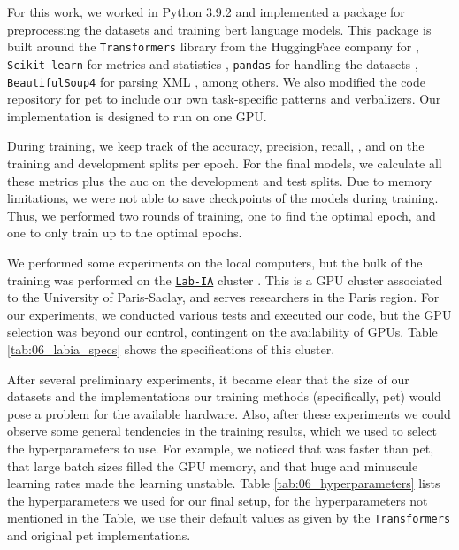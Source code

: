 \label{06_implementation_and_hardware}

For this work, we worked in Python 3.9.2 and implemented a package for preprocessing the datasets and training \gls{bert} language models. This package is built around the \texttt{Transformers} library from the  HuggingFace company  for \finetuning{} , \texttt{Scikit-learn} for metrics and statistics , \texttt{pandas} for handling the datasets , \texttt{BeautifulSoup4} for parsing XML , among others. We also modified the code repository for \gls{pet} to include our own task-specific patterns and verbalizers.  Our implementation is designed to run on one GPU.






During training, we keep track of the accuracy, precision, recall, \fOne{}, and \fTwo{} on the training and development splits per epoch. For the final models, we calculate all these metrics plus the \gls{auc} on the development and test splits. Due to memory limitations, we were not able to save  checkpoints of the models during training. Thus, we performed two rounds of training, one to find the optimal epoch, and one to only train up to the optimal epochs.



We performed some experiments on the \MAIAGE{} local computers, but the bulk of the training was performed on the \href{http://hebergement.universite-paris-saclay.fr/lab-ia/}{\texttt{Lab-IA}} cluster . This is a GPU cluster associated to the University of Paris-Saclay, and serves researchers in the Paris region. For our experiments, we conducted various tests and executed our code, but the GPU selection was beyond our control, contingent on the availability of GPUs. Table \ref{tab:06_labia_specs} shows the specifications of this cluster.







After several preliminary experiments, it became clear that the size of our datasets and the implementations our training methods (specifically, \gls{pet}) would pose a problem for the available hardware. 
Also, after these experiments we could observe some general tendencies in the training results, which we used to select the hyperparameters to use. For example, we noticed that \finetuning{} was faster than \gls{pet}, that large batch sizes filled the GPU memory, and that huge and minuscule learning rates made the learning unstable. Table \ref{tab:06_hyperparameters} lists the hyperparameters we used for our final setup, for the hyperparameters not mentioned in the Table, we use their default values as given by the \texttt{Transformers} and original \gls{pet} implementations.








